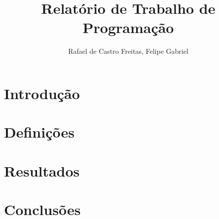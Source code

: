 \documentclass[12pt]{article}
\title{Relatório de Trabalho de Programação}
\author{Rafael de Castro Freitas\inst{1}, Felipe Gabriel\inst{1}}
\begin{document}
 

\maketitle

\begin{abstract}
  
\end{abstract}
     
\begin{resumo} 

\end{resumo}

\section{Introdução}


\section{Definições} 
\label{sec:def}



\section{Resultados}
\label{sec:res}



\section{Conclusões}

%
%
\end{document}
